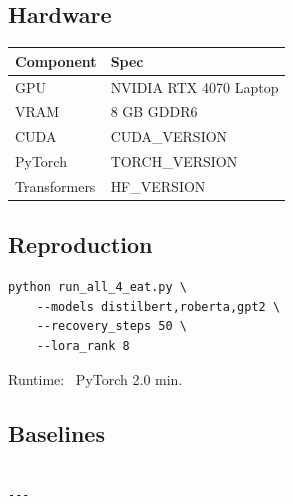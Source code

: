 \subsection{Hardware}

\begin{table}[H]
\centering
\small
\begin{tabular}{ll}
\toprule
\textbf{Component} & \textbf{Spec} \\
\midrule
GPU & NVIDIA RTX 4070 Laptop \\
VRAM & 8 GB GDDR6 \\
CUDA & {{CUDA\_VERSION}} \\
PyTorch & {{TORCH\_VERSION}} \\
Transformers & {{HF\_VERSION}} \\
\bottomrule
\end{tabular}
\end{table}

\subsection{Reproduction}

\begin{lstlisting}
python run_all_4_eat.py \
    --models distilbert,roberta,gpt2 \
    --recovery_steps 50 \
    --lora_rank 8
\end{lstlisting}

Runtime: ~PyTorch 2.0 min.

\subsection{Baselines}

\begin{lstlisting}

---
\end{lstlisting}
